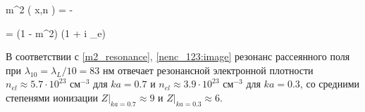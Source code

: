     \eq
        m^2 \left( x,\:n \right) = -  
        \label{m2_resonance}
    \qe

    \eq
         = (1 - m^2) (1 + i \beta_e)
        \label{nenc_resonance}
    \qe


В соответствии с \autoref{m2_resonance}, \autoref{nenc_123:image} резонанс рассеянного поля при $\lambda_{10} = \lambda_{L} / 10 = 83$ нм отвечает резонансной электронной плотности $n_{el} \approx 5.7 \cdot 10^{23}$ $\textrm{см}^{-3}$ для $ka = 0.7$ и $n_{el} \approx 3.9 \cdot 10^{23}$ $\textrm{см}^{-3}$ для $ka = 0.3$, со средними степенями ионизации $Z|_{ka = 0.7} \approx 9$ и $Z|_{ka = 0.3} \approx 6$.


